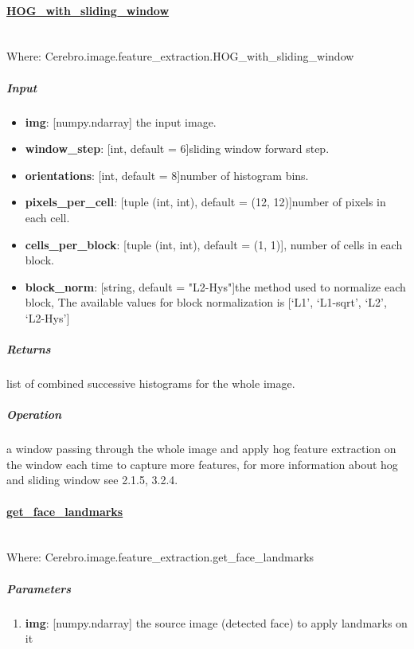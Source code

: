 \paragraph{\underline{HOG\_with\_sliding\_window}} \mbox{}\\
Where: Cerebro.image.feature\_extraction.HOG\_with\_sliding\_window
\subparagraph{Input}
\begin{changemargin}{0.5cm}{0cm}
\begin{itemize}
\item  \textbf{img}: [numpy.ndarray] the input image.
\item  \textbf{window\_step}: [int, default = 6]sliding window forward step.
\item  \textbf{orientations}: [int, default = 8]number of histogram bins.
\item \textbf{pixels\_per\_cell}: [tuple (int, int), default = (12, 12)]number of pixels in each cell.
\item  \textbf{cells\_per\_block}: [tuple (int, int), default = (1, 1)], number of cells in each block.
\item  \textbf{block\_norm}: [string, default = "L2-Hys"]the method used to normalize each block, The available values for block normalization is [‘L1’, ‘L1-sqrt’, ‘L2’, ‘L2-Hys’]
\end{itemize}
\end{changemargin}

\subparagraph{Returns}
\begin{changemargin}{0.5cm}{0cm}
list of combined successive histograms for the whole image.
\end{changemargin}

\subparagraph{Operation} 
\begin{changemargin}{0.5cm}{0cm}
a window passing through the whole image and apply hog feature extraction on the window each time to capture more features, for more information about hog and sliding window see 2.1.5, 3.2.4.
\end{changemargin}

\newpage
\paragraph{\underline{get\_face\_landmarks}} \mbox{}\\
Where: Cerebro.image.feature\_extraction.get\_face\_landmarks
\subparagraph{Parameters}
\begin{changemargin}{0.5cm}{0cm}
	\begin{enumerate} 
		\item \textbf{img}: [numpy.ndarray] the source image (detected face) to apply landmarks on it
	\end{enumerate}
\end{changemargin}


